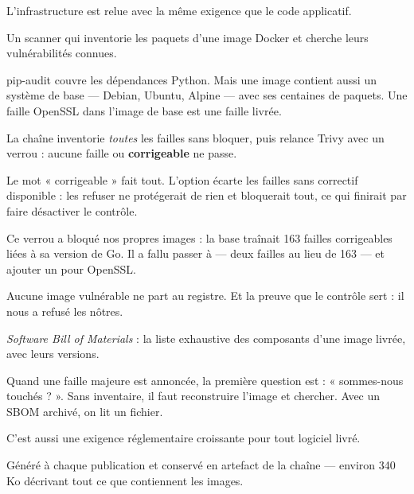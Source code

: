 \apport
L'infrastructure est relue avec la même exigence que le code applicatif.


\quoi
Un scanner qui inventorie les paquets d'une image Docker et cherche leurs
vulnérabilités connues.

\pourquoi
pip-audit couvre les dépendances Python. Mais une image contient aussi un
système de base --- Debian, Ubuntu, Alpine --- avec ses centaines de paquets.
Une faille OpenSSL dans l'image de base est une faille livrée.

\role
La chaîne inventorie \emph{toutes} les failles sans bloquer, puis relance Trivy
avec un verrou : aucune faille  ou 
\textbf{corrigeable} ne passe.

\begin{retenir}
Le mot « corrigeable » fait tout. L'option  écarte les
failles sans correctif disponible : les refuser ne protégerait de rien et
bloquerait tout, ce qui finirait par faire désactiver le contrôle.
\end{retenir}

Ce verrou a bloqué nos propres images : la base  traînait
163 failles corrigeables liées à sa version de Go. Il a fallu passer à
 --- deux failles au lieu de 163 --- et ajouter un
 pour OpenSSL.

\apport
Aucune image vulnérable ne part au registre. Et la preuve que le contrôle sert :
il nous a refusé les nôtres.


\quoi
\emph{Software Bill of Materials} : la liste exhaustive des composants d'une
image livrée, avec leurs versions.

\pourquoi
Quand une faille majeure est annoncée, la première question est : « sommes-nous
touchés ? ». Sans inventaire, il faut reconstruire l'image et chercher. Avec un
SBOM archivé, on lit un fichier.

C'est aussi une exigence réglementaire croissante pour tout logiciel livré.

\role
Généré à chaque publication et conservé en artefact de la chaîne --- environ
340 Ko décrivant tout ce que contiennent les images.

